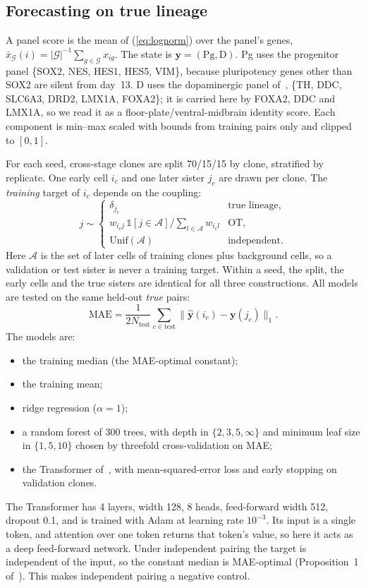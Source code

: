 \documentclass[10pt,journal,compsoc]{IEEEtran}
\begin{document}
\subsection{Forecasting on true lineage }\label{sec:m_rq2}
A panel score is the mean of (\ref{eq:lognorm}) over the panel's genes,
$\bar{x}_{\mathcal{G}}(i)=|\mathcal{G}|^{-1}\sum_{g\in\mathcal{G}}x_{ig}$. The state is
$\mathbf{y}=(\mathrm{Pg},\mathrm{D})$. Pg uses the progenitor panel \{SOX2, NES, HES1, HES5,
VIM\}, because pluripotency genes other than SOX2 are silent from day~13. D uses the
dopaminergic panel of~\cite{Kanu_ICUFN2026,Kanu_TCBB}, \{TH, DDC, SLC6A3, DRD2, LMX1A, FOXA2\}; it is carried here by FOXA2, DDC and LMX1A,
so we read it as a floor-plate/ventral-midbrain identity score. Each component is min--max
scaled with bounds from training pairs only and clipped to $[0,1]$.

For each seed, cross-stage clones are split 70/15/15 by clone, stratified by replicate. One
early cell $i_c$ and one later sister $j_c$ are drawn per clone. The \emph{training} target
of $i_c$ depends on the coupling:
\begin{equation}
j\sim\begin{cases}
\delta_{j_c} & \text{true lineage},\\
w_{i_c j}\,\mathbb{1}[j\in\mathcal{A}]\big/\sum_{l\in\mathcal{A}}w_{i_c l} & \text{OT},\\
\mathrm{Unif}(\mathcal{A}) & \text{independent}.
\end{cases}
\end{equation}
Here $\mathcal{A}$ is the set of later cells of training clones plus background cells, so a
validation or test sister is never a training target. Within a seed, the split, the early
cells and the true sisters are identical for all three constructions. All models are tested
on the same held-out \emph{true} pairs:
\begin{equation}
\mathrm{MAE}=\frac{1}{2N_{\mathrm{test}}}\sum_{c\in\mathrm{test}}\|\hat{\mathbf{y}}(i_c)-\mathbf{y}(j_c)\|_1 .
\end{equation}
The models are:
\begin{itemize}
\item the training median (the MAE-optimal constant);
\item the training mean;
\item ridge regression ($\alpha=1$);
\item a random forest of 300 trees, with depth in $\{2,3,5,\infty\}$ and minimum leaf size
in $\{1,5,10\}$ chosen by threefold cross-validation on MAE;
\item the Transformer of~\cite{Kanu_TCBB}, with mean-squared-error loss and early stopping on
validation clones.
\end{itemize}
The Transformer has 4 layers, width 128, 8 heads, feed-forward width 512, dropout 0.1, and
is trained with Adam at learning rate $10^{-3}$. Its input is a single token, and attention
over one token returns that token's value, so here it acts as a deep feed-forward network.
Under independent
pairing the target is independent of the input, so the constant median is MAE-optimal
(Proposition~1 of~\cite{Kanu_TCBB}). This makes independent pairing a negative control.
\end{document}

